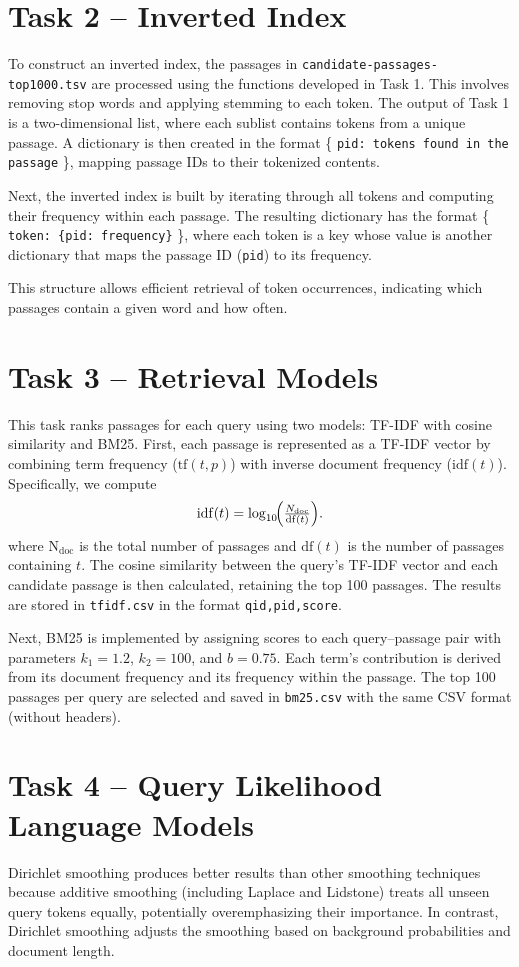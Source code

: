 \documentclass[11pt]{article}
\begin{document}
\section{Task 2 -- Inverted Index}
To construct an inverted index, the passages in \texttt{candidate-passages-top1000.tsv} are processed using the functions developed in Task 1. This involves removing stop words and applying stemming to each token. The output of Task 1 is a two-dimensional list, where each sublist contains tokens from a unique passage. A dictionary is then created in the format \{ \texttt{pid: tokens found in the passage} \}, mapping passage IDs to their tokenized contents.

Next, the inverted index is built by iterating through all tokens and computing their frequency within each passage. The resulting dictionary has the format \{ \texttt{token: \{pid: frequency\}} \}, where each token is a key whose value is another dictionary that maps the passage ID (\texttt{pid}) to its frequency.

This structure allows efficient retrieval of token occurrences, indicating which passages contain a given word and how often.

\section{Task 3 -- Retrieval Models}
This task ranks passages for each query using two models: TF-IDF with cosine similarity and BM25. First, each passage is represented as a TF-IDF vector by combining term frequency (\(\mathrm{tf}(t,p)\)) with inverse document frequency (\(\mathrm{idf}(t)\)). Specifically, we compute
\[
\mathrm{idf}(t) = \log_{10}\!\Bigl(\tfrac{N_{\mathrm{doc}}}{\mathrm{df}(t)}\Bigr).
\]
where \(\mathrm{N_{doc}}\) is the total number of passages and \(\mathrm{df}(t)\) is the number of passages containing \(t\). The cosine similarity between the query’s TF-IDF vector and each candidate passage is then calculated, retaining the top 100 passages. The results are stored in \texttt{tfidf.csv} in the format \texttt{qid,pid,score}.

Next, BM25 is implemented by assigning scores to each query–passage pair with parameters \(k_1 = 1.2\), \(k_2 = 100\), and \(b = 0.75\). Each term’s contribution is derived from its document frequency and its frequency within the passage. The top 100 passages per query are selected and saved in \texttt{bm25.csv} with the same CSV format (without headers).

\section{Task 4 -- Query Likelihood Language Models}
Dirichlet smoothing produces better results than other smoothing techniques because additive smoothing (including Laplace and Lidstone) treats all unseen query tokens equally, potentially overemphasizing their importance. In contrast, Dirichlet smoothing adjusts the smoothing based on background probabilities and document length.
\end{document}
